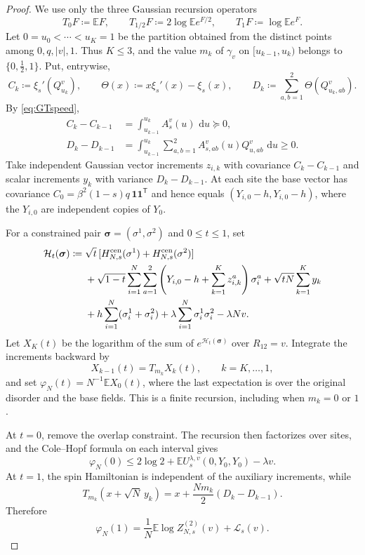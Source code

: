 \documentclass[11pt]{article}
\numberwithin{equation}{section}
\newcommand{\E}{\mathbb{E}}
\newcommand{\1}{\mathbf 1}
\newcommand{\dd}{\,\mathrm d}
\begin{document}
\begin{proof}
We use only the three Gaussian recursion operators
\[
 T_0F\coloneqq\E F,\qquad
 T_{1/2}F\coloneqq2\log\E e^{F/2},\qquad
 T_1F\coloneqq\log\E e^F.
\]
Let $0=u_0<\cdots<u_K=1$ be the partition obtained from the distinct
points among $0,q,|v|,1$.  Thus $K\le3$, and the value $m_k$ of
$\gamma_v$ on $[u_{k-1},u_k)$ belongs to
$\{0,\frac12,1\}$.  Put, entrywise,
\[
 C_k\coloneqq\xi_s'(Q^v_{u_k}),\qquad
 \Theta(x)\coloneqq x\xi_s'(x)-\xi_s(x),\qquad
 D_k\coloneqq\sum_{a,b=1}^2\Theta(Q^v_{u_k,ab}).
\]
By \eqref{eq:GTspeed},
\begin{align*}
 C_k-C_{k-1}&=\int_{u_{k-1}}^{u_k}A_s^v(u)\,\dd u\succeq0,\\
 D_k-D_{k-1}&=\int_{u_{k-1}}^{u_k}
 \sum_{a,b=1}^2A^v_{s,ab}(u)Q^v_{u,ab}\,\dd u\ge0.
\end{align*}
Take independent Gaussian vector increments $z_{i,k}$ with covariance
$C_k-C_{k-1}$ and scalar increments $y_k$ with variance
$D_k-D_{k-1}$.  At each site the base vector has covariance
$C_0=\beta^2(1-s)q\,\mathbf1\mathbf1^{\mathsf T}$ and hence equals
$(Y_{i,0}-h,Y_{i,0}-h)$, where the $Y_{i,0}$ are independent copies
of $Y_0$.

For a constrained pair
$\boldsymbol\sigma=(\sigma^1,\sigma^2)$ and $0\le t\le1$, set
\begin{align*}
 \mathcal H_t(\boldsymbol\sigma)
 \coloneqq{}&\sqrt t\,[H_{N,s}^{\rm cen}(\sigma^1)
                     +H_{N,s}^{\rm cen}(\sigma^2)]\\
 &+\sqrt{1-t}\sum_{i=1}^N\sum_{a=1}^2
 \left(Y_{i,0}-h+\sum_{k=1}^Kz_{i,k}^a\right)\sigma_i^a
 +\sqrt{tN}\sum_{k=1}^K y_k\\
 &+h\sum_{i=1}^N(\sigma_i^1+\sigma_i^2)
 +\lambda\sum_{i=1}^N\sigma_i^1\sigma_i^2-\lambda Nv.
\end{align*}
Let $X_K(t)$ be the logarithm of the sum of
$e^{\mathcal H_t(\boldsymbol\sigma)}$ over $R_{12}=v$.  Integrate the
increments backward by
\[
 X_{k-1}(t)=T_{m_k}X_k(t),\qquad k=K,\ldots,1,
\]
and set $\varphi_N(t)=N^{-1}\E X_0(t)$, where the last expectation is
over the original disorder and the base fields.  This is a finite
recursion, including when $m_k=0$ or $1$.

At $t=0$, remove the overlap constraint.  The recursion then
factorizes over sites, and the Cole--Hopf formula on each interval
gives
\begin{equation}
 \varphi_N(0)\le2\log2+
 \E U_s^{\lambda,v}(0,Y_0,Y_0)-\lambda v.
 \label{eq:GTendpointzero}
\end{equation}
At $t=1$, the spin Hamiltonian is independent of the auxiliary
increments, while
\[
 T_{m_k}(x+\sqrt N\,y_k)
 =x+\frac{Nm_k}{2}(D_k-D_{k-1}).
\]
Therefore
\begin{equation}
 \varphi_N(1)=\frac1N\E\log Z^{(2)}_{N,s}(v)+\mathcal L_s(v).
 \label{eq:GTendpointone}
\end{equation}


\end{proof}
\end{document}
